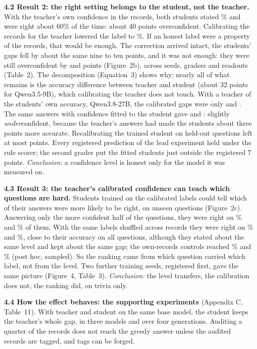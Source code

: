 \documentclass[10pt]{article}
\begin{document}
\textbf{4.2 Result 2: the right setting belongs to the student, not the teacher.} With the teacher's own confidence in the records, both students stated \dQRawConf{}\% and were right about 60\% of the time: about 40 points overconfident. Calibrating the records for the teacher lowered the label to \dTcalLabel{}\%. If an honest label were a property of the records, that would be enough. The correction arrived intact, the students' gaps fell by about the same nine to ten points, and it was not enough: they were still overconfident by \dQTcalGap{} and \dGTcalGap{} points (Figure~2b), across seeds, graders and readouts (Table~2). The decomposition (Equation~3) shows why: nearly all of what remains is the accuracy difference between teacher and student (about 32 points for Qwen3.5-9B), which calibrating the teacher does not touch. With a teacher of the students' own accuracy, Qwen3.8-27B, the calibrated gaps were only \dQMTcalGap{} and \dGMTcalGap{}. The same answers with confidence fitted to the student gave \dQScalGap{} and \dGScalGap{}: slightly \emph{under}confident, because the teacher's answers had made the students about three points more accurate. Recalibrating the trained student on held-out questions left at most \dRecalMax{} points. Every registered prediction of the lead experiment held under the rule scorer; the second grader put the fitted students just outside the registered 7 points. \emph{Conclusion:} a confidence level is honest only for the model it was measured on.


\textbf{4.3 Result 3: the teacher's calibrated confidence can teach which questions are hard.} Students trained on the calibrated labels could tell which of their answers were more likely to be right, on unseen questions (Figure~2c). Answering only the more confident half of the questions, they were right on \dQSelTcal{}\% and \dGSelTcal{}\% of them. With the same labels shuffled across records they were right on \dQSelShuf{}\% and \dGSelShuf{}\%, close to their accuracy on all questions, although they stated about the same level and kept about the same gap; the own-records controls reached \dQSelOwn{}\% and \dGSelOwn{}\% (post hoc, sampled). So the ranking came from which question carried which label, not from the level. Two further training seeds, registered first, gave the same picture (Figure~4, Table~3). \emph{Conclusion:} the level transfers, the calibration does not, the ranking did, on trivia only.

\textbf{4.4 How the effect behaves: the supporting experiments} (Appendix C, Table~11). With teacher and student on the same base model, the student keeps the teacher's whole gap, in three models and over four generations. Auditing a quarter of the records does not reach the greedy answer unless the audited records are tagged, and tags can be forged.
\end{document}
